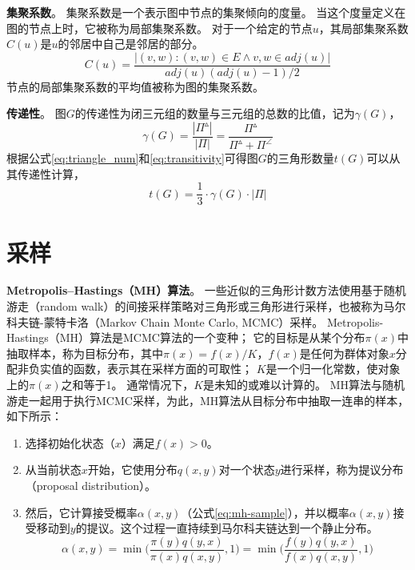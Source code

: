 \textbf{集聚系数}。
集聚系数是一个表示图中节点的集聚倾向的度量。
当这个度量定义在图的节点上时，它被称为局部集聚系数。
对于一个给定的节点$u$，其局部集聚系数$C(u)$是$u$的邻居中自己是邻居的部分。
\begin{equation}
    C(u)=\frac{|(v,w):(v,w)\in E\land v,w\in adj(u)|}{adj(u)(adj(u)-1)/2}
    \label{eq:clustering_coef}
\end{equation}
节点的局部集聚系数的平均值被称为图的集聚系数。

\textbf{传递性}。
图$G$的传递性为闭三元组的数量与三元组的总数的比值，记为$\gamma(G)$，
\begin{equation}
    \gamma(G)=\frac{|\Pi^\vartriangle|}{|\Pi|}=\frac{\Pi^\vartriangle}{\Pi^\vartriangle+\Pi^\angle}
    \label{eq:transitivity}
\end{equation}
根据公式\ref{eq:triangle_num}和\ref{eq:transitivity}可得图$G$的三角形数量$t(G)$可以从其传递性计算，
\begin{equation}
    t(G)=\frac{1}{3}\cdot \gamma(G) \cdot |\Pi| 
    \label{eq:tc_trans}
\end{equation}

\section{采样}

\textbf{Metropolis–Hastings（MH）算法}。
一些近似的三角形计数方法使用基于随机游走（random walk）的间接采样策略对三角形或三角形进行采样，也被称为马尔科夫链-蒙特卡洛（Markov Chain Monte Carlo, MCMC）采样。
Metropolis-Hastings（MH）算法是MCMC算法的一个变种；
它的目标是从某个分布$\pi(x)$中抽取样本，称为目标分布，其中$\pi(x)=f(x)/K$，$f(x)$是任何为群体对象$x$分配非负实值的函数，表示其在采样方面的可取性；
$K$是一个归一化常数，使对象上的$\pi(x)$之和等于1。
通常情况下，$K$是未知的或难以计算的。
MH算法与随机游走一起用于执行MCMC采样，为此，MH算法从目标分布中抽取一连串的样本，如下所示：
\begin{enumerate}
    \item 选择初始化状态（$x$）满足$f(x)>0$。
    \item 从当前状态$x$开始，它使用分布$q(x, y)$对一个状态$y$进行采样，称为提议分布（proposal distribution）。
    \item 然后，它计算接受概率$\alpha (x,y)$（公式\ref{eq:mh-sample}），并以概率$\alpha (x,y)$接受移动到$y$的提议。这个过程一直持续到马尔科夫链达到一个静止分布。
    \begin{equation}
        \alpha (x,y)=\min\Bigg(\frac{\pi(y)q(y,x)}{\pi(x)q(x,y)},1 \Bigg)=\min\Bigg(\frac{f(y)q(y,x)}{f(x)q(x,y)},1 \Bigg)
        \label{eq:mh-sample}
    \end{equation}
\end{enumerate}

